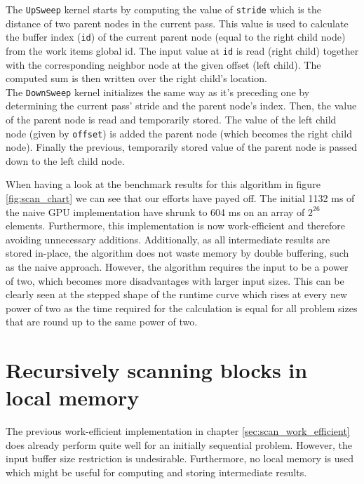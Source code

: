The \lstinline!UpSweep! kernel starts by computing the value of \lstinline!stride! which is the distance of two parent nodes in the current pass. This value is used to calculate the buffer index (\lstinline!id!) of the current parent node (equal to the right child node) from the work items global id. The input value at \lstinline!id! is read (right child) together with the corresponding neighbor node at the given offset (left child). The computed sum is then written over the right child's location. \\
The \lstinline!DownSweep! kernel initializes the same way as it's preceding one by determining the current pass' stride and the parent node's index. Then, the value of the parent node is read and temporarily stored. The value of the left child node (given by \lstinline!offset!) is added the parent node (which becomes the right child node). Finally the previous, temporarily stored value of the parent node is passed down to the left child node.

When having a look at the benchmark results for this algorithm in figure \ref{fig:scan_chart} we can see that our efforts have payed off. The initial 1132 ms of the naive GPU implementation have shrunk to 604 ms on an array of $2^{26}$ elements. Furthermore, this implementation is now work-efficient and therefore avoiding unnecessary additions. Additionally, as all intermediate results are stored in-place, the algorithm does not waste memory by double buffering, such as the naive approach. However, the algorithm requires the input to be a power of two, which becomes more disadvantages with larger input sizes. %
This can be clearly seen at the stepped shape of the runtime curve which rises at every new power of two as the time required for the calculation is equal for all problem sizes that are round up to the same power of two.

\section{Recursively scanning blocks in local memory}
\label{sec:scan_recursive}

The previous work-efficient implementation in chapter \ref{sec:scan_work_efficient} does already perform quite well for an initially sequential problem. However, the input buffer size restriction is undesirable. Furthermore, no local memory is used which might be useful for computing and storing intermediate results.

